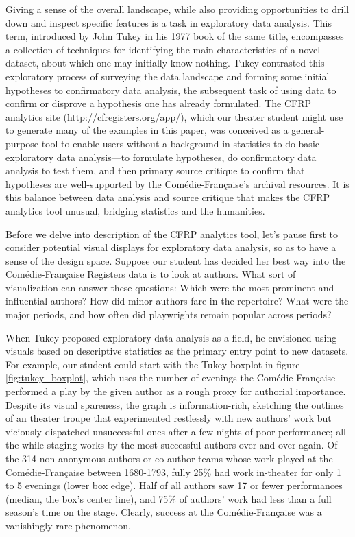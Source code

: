 \documentclass[	DIV=calc,%
							paper=a4,%
							fontsize=11pt,%
							twocolumn]{scrartcl}	 					%
\begin{document}
Giving a sense of the overall landscape, while also providing opportunities to drill down and inspect specific features is a task in exploratory data analysis. This term, introduced by John Tukey in his 1977 book of the same title, encompasses a collection of techniques for identifying the main characteristics of a novel dataset, about which one may initially know nothing.  Tukey contrasted this exploratory process of surveying the data landscape and forming some initial hypotheses to confirmatory data analysis, the subsequent task of using data to confirm or disprove a hypothesis one has already formulated.\cite{TUKEY:1977}  The CFRP analytics site (http://cfregisters.org/app/)\cite{YORK:2017}, which our theater student might use to generate many of the examples in this paper, was conceived as a general-purpose tool to enable users without a background in statistics to do basic exploratory data analysis—to formulate hypotheses, do confirmatory data analysis to test them, and then primary source critique to confirm that hypotheses are well-supported by the Comédie-Française’s archival resources.  It is this balance between data analysis and source critique that makes the CFRP analytics tool unusual, bridging statistics and the humanities.

Before we delve into description of the CFRP analytics tool, let’s pause first to consider potential visual displays for exploratory data analysis, so as to have a sense of the design space. Suppose our student has decided her best way into the Comédie-Française Registers data is to look at authors.  What sort of visualization can answer these questions: Which were the most prominent and influential authors?  How did minor authors fare in the repertoire?  What were the major periods, and how often did playwrights remain popular across periods?

When Tukey proposed exploratory data analysis as a field, he envisioned using visuals based on descriptive statistics as the primary entry point to new datasets.  For example, our student could start with the Tukey boxplot in figure \ref{fig:tukey_boxplot}, which uses the number of evenings the Comédie Française performed a play by the given author as a rough proxy for authorial importance.  Despite its visual spareness, the graph is information-rich, sketching the outlines of an theater troupe that experimented restlessly with new authors’ work but viciously dispatched unsuccessful ones after a few nights of poor performance; all the while staging works by the most successful authors over and over again. Of the 314 non-anonymous authors or co-author teams whose work played at the Comédie-Française between 1680-1793, fully 25\% had work in-theater for only 1 to 5 evenings (lower box edge).  Half of all authors saw 17 or fewer performances (median, the box’s center line), and 75\% of authors’ work had less than a full season’s time on the stage.  Clearly, success at the Comédie-Française was a vanishingly rare phenomenon.
\end{document}
